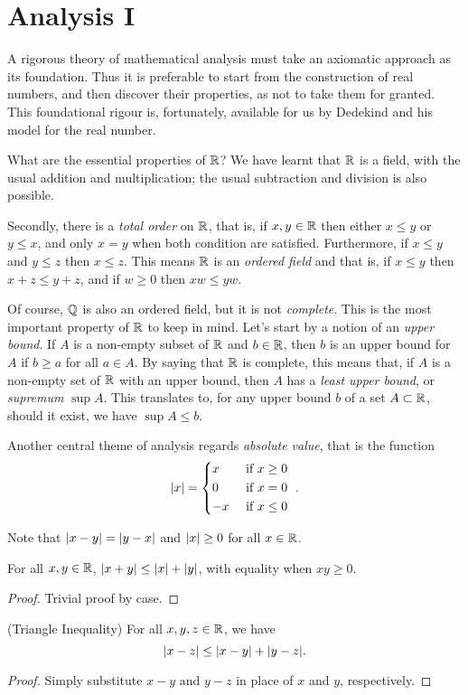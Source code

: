 \documentclass[main.tex]{subfiles}
\begin{document}
	\chapter{Analysis I}
	A rigorous theory of mathematical analysis must take an axiomatic approach as its foundation. Thus it is preferable to start from the construction of real numbers, and then discover their properties, as not to take them for granted. This foundational rigour is, fortunately, available for us by Dedekind and his model for the real number.
	
	What are the essential properties of $\mathbb R$? We have learnt that $\mathbb R$ is a field, with the usual addition and multiplication; the usual subtraction and division is also possible.
	
	Secondly, there is a \textit{total order} on $\mathbb R$, that is, if $x, y \in \mathbb R$ then either $x \leq y$ or $y \leq x$, and only $x = y$ when both condition are satisfied. Furthermore, if $x \leq y$ and $y \leq z$ then $x \leq z$. This means $\mathbb R$ is an \textit{ordered field} and that is, if $x \leq y$ then $x + z \leq y + z$, and if $w \geq 0$ then $xw \leq yw$.
	
	Of course, $\mathbb Q$ is also an ordered field, but it is not \textit{complete}. This is the most important property of $\mathbb R$ to keep in mind. Let's start by a notion of an \textit{upper bound}. If $A$ is a non-empty subset of $\mathbb R$ and $b \in \mathbb R$, then $b$ is an upper bound for $A$ if $b \geq a$ for all $a \in A$. By saying that $\mathbb R$ is complete, this means that, if $A$ is a non-empty set of $\mathbb R$ with an upper bound, then $A$ has a \textit{least upper bound}, or \textit{supremum} $\sup A$. This translates to, for any upper bound $b$ of a set $A \subset \mathbb R$, should it exist, we have $\sup A \leq b$.
	
	Another central theme of analysis regards \textit{absolute value}, that is the function
	\begin{equation}\abs{x} = 
	\begin{cases*}
	x & \text{ if $x \geq 0$}\\
	0 & \text{ if $x = 0$} \\
	-x & \text{ if $x \leq 0$}
	\end{cases*}.
	\end{equation}
	
	Note that $\lvert x - y\rvert = \lvert y - x\rvert$ and $\lvert x\rvert \geq 0$ for all $x \in \mathbb R$. 
	\begin{theorem}
		For all $x, y \in \mathbb R$, $\lvert x + y\rvert \leq \lvert x\rvert + \lvert y\rvert$, with equality when $ xy \geq 0$.
	\end{theorem}
	\begin{proof}
		Trivial proof by case.
	\end{proof}
	\begin{theorem}(Triangle Inequality)
		For all $x, y, z \in \mathbb R$, we have
		\begin{equation}
		\lvert x - z\rvert \leq \lvert x - y\rvert + \lvert y - z\rvert.
		\end{equation}
	\end{theorem}
	\begin{proof}
		Simply substitute $x - y$ and $y - z$ in place of $x$ and $y$, respectively.
	\end{proof}
\end{document}
